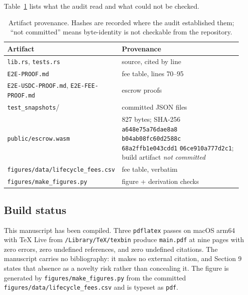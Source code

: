 \documentclass[sigconf,review]{acmart}
\begin{document}
Table~\ref{tab:artifacts} lists what the audit read and what could not be
checked.

\begin{table}[t]
\caption{Artifact provenance. Hashes are recorded where the audit established
them; ``not committed'' means byte-identity is not checkable from the
repository.}
\label{tab:artifacts}
\small
\begin{tabular}{@{}>{\raggedright\arraybackslash}p{0.30\linewidth}%
                 >{\raggedright\arraybackslash}p{0.66\linewidth}@{}}
\toprule
Artifact & Provenance \\
\midrule
\texttt{lib.rs}, \texttt{tests.rs} & source, cited by line \\
\texttt{E2E-PROOF.md} & fee table, lines 70--95 \\
\texttt{E2E-USDC-PROOF.md}, \newline \texttt{E2E-FEE-PROOF.md} & escrow proofs \\
\texttt{test\_snapshots}/ & 26 committed JSON files \\
\texttt{public/escrow.wasm} & 24{,}827 bytes; SHA-256 \newline
  \texttt{a648e75a76dae8a8} \newline
  \texttt{b04ab08fc60d2588c} \newline
  \texttt{68a2ffb1e043cdd1} \newline
  \texttt{06ce910a777d2c1}; \newline
  build artifact \emph{not committed} \\
\texttt{figures/data/}\newline \texttt{lifecycle\_fees.csv} & fee table, verbatim \\
\texttt{figures/make\_figures.py} & figure + derivation checks \\
\bottomrule
\end{tabular}
\end{table}

\subsection{Build status}
This manuscript has been compiled. Three \texttt{pdflatex} passes on
macOS arm64 with TeX Live from \texttt{/Library/TeX/texbin} produce
\texttt{main.pdf} at nine pages with zero errors, zero undefined references,
and zero undefined citations. The manuscript carries no bibliography: it makes
no external citation, and Section 9 states that absence as a novelty risk
rather than concealing it. The figure is generated by
\texttt{figures/make\_figures.py} from the committed
\texttt{figures/data/lifecycle\_fees.csv} and is typeset as \texttt{pdf}.
\end{document}
